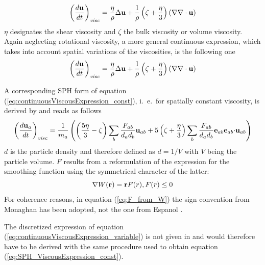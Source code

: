 \documentclass[11pt,a4paper,twoside]{report}
\begin{document}
\begin{equation}
\label{eq:continuousViscousExpression_const}
\left(\frac{d{\bf u}}{dt}\right)_{\mathit{visc}}=\frac{\eta}{\rho}\Delta {\bf u}+\frac{1}{\rho}\left(\zeta +\frac{\eta}{3}\right)\left(\nabla \nabla \cdot {\bf u}\right)
\end{equation}
$\eta$ designates the shear viscosity and $\zeta$ the bulk viscosity or volume viscosity.
Again neglecting rotational viscosity, a more general continuous expression, which takes into account spatial variations of the viscosities, is the following one
\begin{equation}
\label{eq:continuousViscousExpression_variable}
\left(\frac{d{\bf u}}{dt}\right)_{\mathit{visc}}=\frac{\eta}{\rho}\Delta {\bf u}+\frac{1}{\rho}\left(\zeta +\frac{\eta}{3}\right)\left(\nabla \nabla \cdot {\bf u}\right)
\end{equation}


A corresponding SPH form of equation (\ref{eq:continuousViscousExpression_const}), i.\ e.\ for spatially constant viscosity, is derived by \cite{Espanol2003} and reads as follows
\begin{equation}
\label{eq:SPH_ViscousExpression_const}
\left(\frac{d{\bf u}_a}{dt}\right)_{\mathit{visc}}=\frac{1}{m_a}\left( \left(\frac{5\eta}{3}-\zeta\right)\sum_b\frac{F_{ab}}{d_a d_b}{\bf u}_{ab}+5\left(\zeta+\frac{\eta}{3}\right) \sum_b\frac{F_{ab}}{d_a d_b}{\bf e}_{ab} {\bf e}_{ab}{\bf \cdot u}_{ab}\right)
\end{equation}
$d$ is the particle density and therefore defined as $d=1/V$ with $V$ being the particle volume. $F$ results from a reformulation of the expression for the smoothing function using the symmetrical character of the latter:
\begin{equation}
 \label{eq:F_from_W}
\nabla W({\bf r})={\bf r} F(r), F(r)\leq 0
\end{equation}
For coherence reasons, in equation (\ref{eq:F_from_W}) the sign convention from Monaghan \cite{Monaghan2005} has been adopted, not the one from Espanol \cite{Espanol2003}.

The discretized expression of equation (\ref{eq:continuousViscousExpression_variable}) is not given in \cite{Espanol2003} and would therefore have to be derived with the same procedure used to obtain equation (\ref{eq:SPH_ViscousExpression_const}). 
\end{document}
